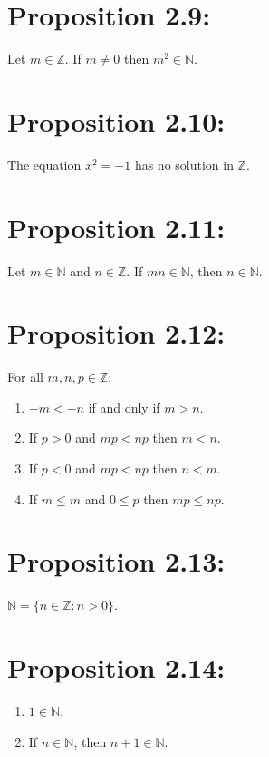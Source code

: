 \section*{Proposition 2.9:}
Let $m \in \mathbb{Z}$. If $m \neq 0$ then $m^2 \in \mathbb{N}$.

\section*{Proposition 2.10:}
The equation $x^2 = -1$ has no solution in $\mathbb{Z}$.

\section*{Proposition 2.11:}
Let $m \in \mathbb{N}$ and $n \in \mathbb{Z}$. If $mn \in \mathbb{N}$, then $n \in \mathbb{N}$.

\section*{Proposition 2.12:}
For all $m,n,p \in \mathbb{Z}$:
\begin{enumerate}[label=(\roman*)]
    \item $-m < -n$ if and only if $m > n$.
    \item If $p > 0$ and $mp < np$ then $m < n$.
    \item If $p < 0$ and $mp < np$ then $n < m$.
    \item If $m \leq m$ and $0 \leq p$ then $mp \leq np$.
\end{enumerate}


\section*{Proposition 2.13:}
$\mathbb{N} = \{ n \in \mathbb{Z} : n > 0 \}$.

\section*{Proposition 2.14:}
\begin{enumerate}[label=(\roman*)]
    \item $1 \in \mathbb{N}$.
    \item If $n \in \mathbb{N}$, then $n+1 \in \mathbb{N}$.
\end{enumerate}

